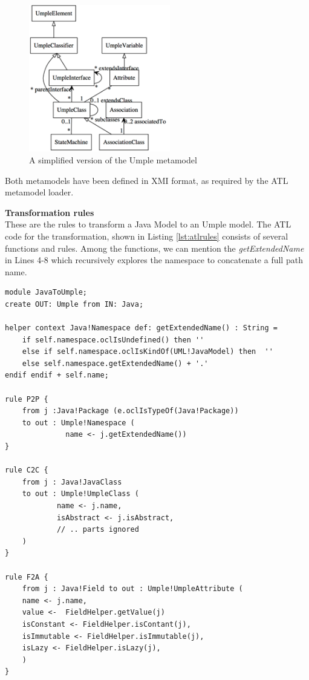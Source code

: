\begin{figure}[h]
\centering
\includegraphics[width=0.55\textwidth]{Figures/umpleMetamodel.png} 
\caption{A simplified version of the Umple metamodel}
\label{fig:umplemodelatl}
\end{figure}

Both metamodels have been defined in XMI format, as required by the ATL metamodel loader.

\textbf{Transformation rules} \\

These are the rules to transform a Java Model to an Umple model. The ATL code for the transformation, shown in Listing \ref{lst:atlrules} consists of several functions and rules. Among the functions, we can mention the \textit{getExtendedName} in Lines 4-8 which recursively explores the namespace to concatenate a full path name.


\begin{lstlisting}[style=atl, label=lst:atlrules, caption=ATL Transformations rules]
module JavaToUmple;
create OUT: Umple from IN: Java;

helper context Java!Namespace def: getExtendedName() : String = 
	if self.namespace.oclIsUndefined() then '' 	
	else if self.namespace.oclIsKindOf(UML!JavaModel) then 	'' 
	else self.namespace.getExtendedName() + '.'
endif endif + self.name;

rule P2P { 
	from j :Java!Package (e.oclIsTypeOf(Java!Package)) 	
	to out : Umple!Namespace ( 		
			  name <- j.getExtendedName())
}

rule C2C { 	
	from j : Java!JavaClass 	
	to out : Umple!UmpleClass ( 	
			name <- j.name, 	
			isAbstract <- j.isAbstract,      
			// .. parts ignored		
	)
}

rule F2A { 	
	from j : Java!Field to out : Umple!UmpleAttribute ( 		
	name <- j.name,
	value <-  FieldHelper.getValue(j) 	
	isConstant <- FieldHelper.isContant(j), 		
	isImmutable <- FieldHelper.isImmutable(j), 		
	isLazy <- FieldHelper.isLazy(j),
	)
}

\end{lstlisting}

